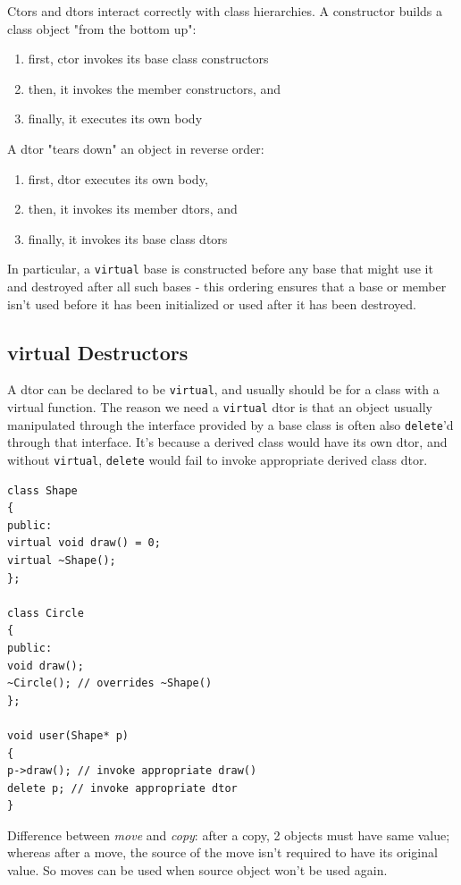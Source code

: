 \documentclass[10pt]{amsart}
\begin{document}
Ctors and dtors interact correctly with class hierarchies. A constructor builds a class object "from the bottom up":
\begin{enumerate}
	\item first, ctor invokes its base class constructors
	\item then, it invokes the member constructors, and
	\item finally, it executes its own body
\end{enumerate}
A dtor "tears down" an object in reverse order:
\begin{enumerate}
	\item first, dtor executes its own body,
	\item then, it invokes its member dtors, and
	\item finally, it invokes its base class dtors
\end{enumerate}

In particular, a \verb|virtual| base is constructed before any base that might use it and destroyed after all such bases - this ordering ensures that a base or member isn't used before it has been initialized or used after it has been destroyed.

\subsection{virtual Destructors}

A dtor can be declared to be \verb|virtual|, and usually should be for a class with a virtual function. The reason we need a \verb|virtual| dtor is that an object usually manipulated through the interface provided by a base class is often also \verb|delete|'d through that interface. It's because a derived class would have its own dtor, and without \verb|virtual|, \verb|delete| would fail to invoke appropriate derived class dtor.

\begin{lstlisting}
class Shape
{
public:
virtual void draw() = 0;
virtual ~Shape();
};

class Circle
{
public:
void draw();
~Circle(); // overrides ~Shape()
};

void user(Shape* p)
{
p->draw(); // invoke appropriate draw()
delete p; // invoke appropriate dtor
}
\end{lstlisting}


Difference between \emph{move} and \emph{copy}: after a copy, 2 objects must have same value; whereas after a move, the source of the move isn't required to have its original value.  So moves can be used when source object won't be used again.  
\end{document}
